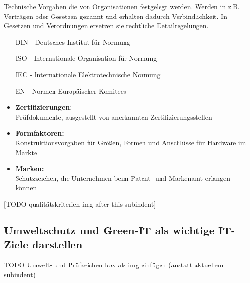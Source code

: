     \begin{tcolorbox}[width=11cm, center, title=Normen, coltitle=white, colframe=orange, colback=white!60!orange]
        Technische Vorgaben die von Organisationen festgelegt werden. Werden in z.B. Verträgen oder Gesetzen genannt und erhalten dadurch Verbindlichkeit.
        In Gesetzen und Verordnungen ersetzen sie rechtliche Detailregelungen.
    \end{tcolorbox}

    \begin{tcolorbox}[width=10cm, center, title=Abkürzungen, coltitle=white, colframe=white!20!blue, colback=white!80!blue]
        \begin{itemize}[itemsep=0.01em, parsep=0.3em]
            \item[DIN -] Deutsches Institut für Normung
            \item[ISO -] Internationale Organisation für Normung
            \item[IEC -] Internationale Elektrotechnische Normung
            \item[EN -] Normen Europäischer Komitees 
        \end{itemize}
    \end{tcolorbox}

    \begin{subindent}
        \begin{itemize}[leftmargin=2.5cm, topsep=0.3em, itemsep=0.1em, parsep=0.5em]
            \item \textbf{Zertifizierungen:} \\ Prüfdokumente, ausgestellt von anerkannten Zertifizierungsstellen
            \item \textbf{Formfaktoren:} \\ Konstruktionsvorgaben für Größen, Formen und Anschlüsse für Hardware im Markte
            \item \textbf{Marken:} \\ Schutzzeichen, die Unternehmen beim Patent- und Markenamt erlangen können   
        \end{itemize}
        [TODO qualitätskriterien img after this subindent]
    \end{subindent}

\newpage
\subsection{Umweltschutz und Green-IT als wichtige IT-Ziele darstellen}
    \begin{subindent}
        TODO Umwelt- und Prüfzeichen box als img einfügen (anstatt aktuellem subindent)
    \end{subindent}

